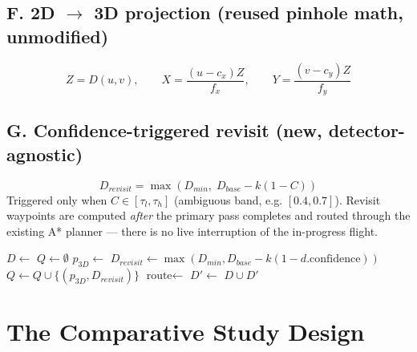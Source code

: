 \documentclass[11pt,a4paper]{article}
\begin{document}
\subsection{F. 2D $\rightarrow$ 3D projection (reused pinhole math, unmodified)}
\begin{equation}
Z = D(u,v), \qquad
X = \frac{(u-c_x)Z}{f_x}, \qquad
Y = \frac{(v-c_y)Z}{f_y}
\end{equation}

\subsection{G. Confidence-triggered revisit (new, detector-agnostic)}
\begin{equation}
D_{revisit} = \max\left(D_{min},\; D_{base} - k(1-C)\right)
\end{equation}
Triggered only when $C \in [\tau_l, \tau_h]$ (ambiguous band, e.g. $[0.4, 0.7]$). Revisit waypoints are computed \emph{after} the primary pass completes and routed through the existing A* planner --- there is no live interruption of the in-progress flight.

\begin{algorithm}[h!]
\caption{Post-flight revisit pass (detector-agnostic)}
\begin{algorithmic}[1]
\State $D \gets$ 
\State $Q \gets \emptyset$ 
        \State $p_{3D} \gets$ 
        \State $D_{revisit} \gets \max(D_{min}, D_{base} - k(1 - d.\text{confidence}))$
        \State $Q \gets Q \cup \{(p_{3D}, D_{revisit})\}$
    \EndIf
\EndFor
\State $\text{route} \gets$  
\State {}
\State $D' \gets$ 
\State \Return $D \cup D'$ 
\end{algorithmic}
\end{algorithm}

\section{The Comparative Study Design}
\end{document}

